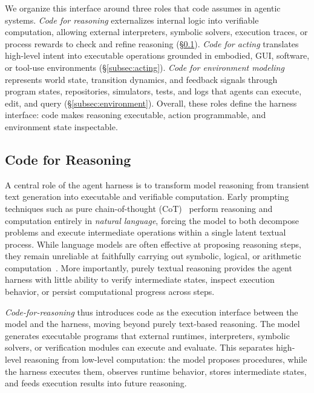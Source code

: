 \documentclass{llmxive}
\begin{document}
We organize this interface around three roles that code assumes in
agentic systems. \emph{Code for reasoning} externalizes internal
logic into verifiable computation, allowing external interpreters,
symbolic solvers, execution traces, or process rewards to check
and refine reasoning (\S\ref{subsec:reasoning}). \emph{Code for
acting} translates high-level intent into executable operations
grounded in embodied, GUI, software, or tool-use environments
(\S\ref{subsec:acting}). \emph{Code for environment modeling}
represents world state, transition dynamics, and feedback signals
through program states, repositories, simulators, tests, and logs
that agents can execute, edit, and query
(\S\ref{subsec:environment}). Overall, these roles define the
harness interface: code makes reasoning executable, action
programmable, and environment state inspectable.





\subsection{Code for Reasoning}
\label{subsec:reasoning}

A central role of the agent harness is to transform model
reasoning from transient text generation into executable and verifiable computation. Early prompting techniques such as pure chain-of-thought (CoT)~\cite{wei2022chain} perform reasoning and computation
entirely in \textit{natural language}, forcing the model to both decompose problems and execute intermediate operations within a single latent textual process.
While language models are often effective at proposing reasoning steps, they remain unreliable at faithfully carrying out symbolic, logical, or arithmetic computation~\cite{gao2023pal}. More importantly, purely textual reasoning provides the agent harness
with little ability to verify intermediate states, inspect execution behavior, or persist computational progress across steps.

\textit{Code-for-reasoning} thus introduces code as the execution interface
between the model and the harness, moving beyond purely text-based reasoning. The model generates executable programs that external runtimes, interpreters, symbolic solvers, or verification modules can execute and evaluate.
This separates high-level reasoning from low-level computation:
the model proposes procedures, while the harness executes them,
observes runtime behavior, stores intermediate states, and feeds
execution results into future reasoning.
\end{document}
